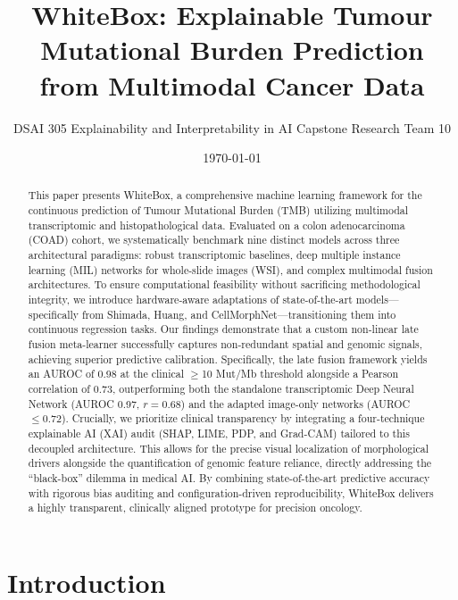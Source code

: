 \documentclass[11pt,a4paper]{article}
\title{WhiteBox: Explainable Tumour Mutational Burden Prediction from Multimodal Cancer Data}
\author{DSAI 305 Explainability and Interpretability in AI Capstone Research Team 10}
\date{\today}
\begin{document}
\maketitle

\begin{abstract}
This paper presents WhiteBox, a comprehensive machine learning framework for the continuous prediction of Tumour Mutational Burden (TMB) utilizing multimodal transcriptomic and histopathological data. Evaluated on a colon adenocarcinoma (COAD) cohort, we systematically benchmark nine distinct models across three architectural paradigms: robust transcriptomic baselines, deep multiple instance learning (MIL) networks for whole-slide images (WSI), and complex multimodal fusion architectures. To ensure computational feasibility without sacrificing methodological integrity, we introduce hardware-aware adaptations of state-of-the-art models—specifically from Shimada, Huang, and CellMorphNet—transitioning them into continuous regression tasks. Our findings demonstrate that a custom non-linear late fusion meta-learner successfully captures non-redundant spatial and genomic signals, achieving superior predictive calibration. Specifically, the late fusion framework yields an AUROC of 0.98 at the clinical $\geq$10 Mut/Mb threshold alongside a Pearson correlation of 0.73, outperforming both the standalone transcriptomic Deep Neural Network (AUROC 0.97, $r=0.68$) and the adapted image-only networks (AUROC $\leq 0.72$). Crucially, we prioritize clinical transparency by integrating a four-technique explainable AI (XAI) audit (SHAP, LIME, PDP, and Grad-CAM) tailored to this decoupled architecture. This allows for the precise visual localization of morphological drivers alongside the quantification of genomic feature reliance, directly addressing the ``black-box'' dilemma in medical AI. By combining state-of-the-art predictive accuracy with rigorous bias auditing and configuration-driven reproducibility, WhiteBox delivers a highly transparent, clinically aligned prototype for precision oncology.
\end{abstract}

\newpage
\tableofcontents
\newpage

\section{Introduction}
\label{sec:intro}
\end{document}
